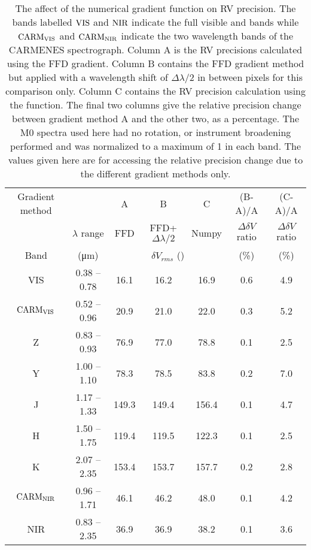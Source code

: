 
\begin{table}
    \centering
    \caption[Affect of numerial gradient.]{The affect of the numerical gradient function on {RV} precision.
        The bands labelled \(\rm VIS\) and \(\rm NIR\) indicate the full visible and \nir{} bands while  \(\rm CARM_{VIS}\)  and \(\rm CARM_{NIR}\) indicate the two wavelength bands of the {CARMENES} spectrograph.
        Column A is the RV precisions calculated using the {FFD} gradient.
        Column B contains the {FFD} gradient method but applied with a wavelength shift of \(\Delta\lambda/2\) in between pixels for this comparison only.
        Column C contains the RV precision calculation using the \npgradient{} function.
        The final two columns give the relative precision change between gradient method A and the other two, as a percentage.
        The {M0} spectra used here had no rotation, or instrument broadening performed and was normalized to a maximum of 1 in each band.
        The values given here are for accessing the relative precision change due to the different gradient methods only.}
    \begin{tabular}{ccccccc}
        \toprule
        Gradient method &  &  A &   B & C & (B-A)/A & (C-A)/A \\
        &   \(\lambda\) range & FFD & FFD+\(\Delta\lambda/2\) &  Numpy & \(\Delta\delta V\) ratio& \(\Delta\delta V\) ratio\\

        Band  & (\si{\micro\meter})  & \multicolumn{3}{c}{\(\delta V_{rms}\) (\mps{})}  & (\%) & (\%) \\
        \midrule
        VIS & 0.38 -- 0.78 & 16.1 & 16.2 & 16.9  & 0.6 & 4.9\\
        \(\rm CARM_{VIS}\) & 0.52 --  0.96 & 20.9 & 21.0 & 22.0 & 0.3 & 5.2 \\
        Z & 0.83 -- 0.93 & 76.9 & 77.0 & 78.8  & 0.1 & 2.5\\
        Y & 1.00 -- 1.10 & 78.3 & 78.5 & 83.8 & 0.2 & 7.0 \\
        J & 1.17 -- 1.33 & 149.3 & 149.4 & 156.4 & 0.1 & 4.7 \\
        H & 1.50 -- 1.75 & 119.4 & 119.5 & 122.3 & 0.1 & 2.5 \\
        K & 2.07 -- 2.35 & 153.4 & 153.7 & 157.7  & 0.2 & 2.8\\
        \(\rm CARM_{NIR}\) & 0.96 -- 1.71 & 46.1 & 46.2 & 48.0 & 0.1 & 4.2 \\
        NIR & 0.83 -- 2.35 & 36.9 & 36.9 & 38.2 & 0.1 & 3.6  \\
        \bottomrule
    \end{tabular}\label{tab:numerical_gradients}
\end{table}
